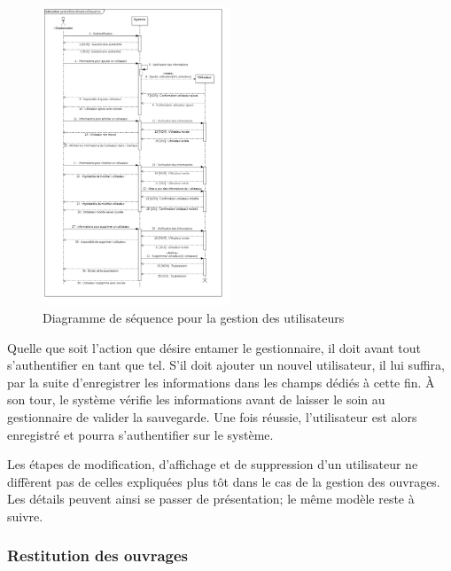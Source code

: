 \paragraph{}
\begin{figure}[h]
        \centering
        \includegraphics[width=0.5\textwidth]{gestionDesUtilisateursSequence}
        \caption{Diagramme de séquence pour la gestion des utilisateurs}
        \label{image-gestionDesUtilisateursSequence}
        \end{figure}
\par
Quelle que soit l'action que désire entamer le gestionnaire, il doit avant tout s'authentifier
en tant que tel. S'il doit ajouter un nouvel utilisateur, il lui suffira, par la suite 
d'enregistrer les informations dans les champs dédiés à cette fin. À son tour, le système 
vérifie les informations avant de laisser le soin au gestionnaire de valider la sauvegarde.
Une fois réussie, l'utilisateur est alors enregistré et pourra s'authentifier sur le 
système. \par 
Les étapes de modification, d'affichage et de suppression d'un utilisateur ne diffèrent 
pas de celles expliquées plus tôt dans le cas de la gestion des ouvrages. Les détails 
peuvent ainsi se passer de présentation; le même modèle reste à suivre.
\subsubsection{Restitution des ouvrages} 
